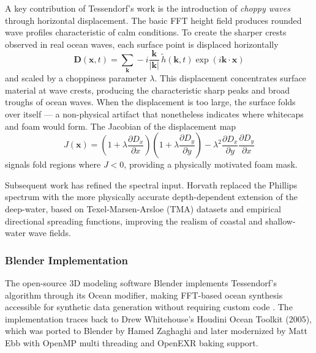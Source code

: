     A key contribution of Tessendorf's work is the introduction of \emph{choppy waves} through horizontal displacement. The basic FFT height field produces rounded wave profiles characteristic of calm conditions. To create the sharper crests observed in real ocean waves, each surface point is displaced horizontally
    \begin{equation}
        \mathbf{D}(\mathbf{x}, t) = \sum_{\mathbf{k}} -i\frac{\mathbf{k}}{|\mathbf{k}|}\, \tilde{h}(\mathbf{k}, t) \exp(i\mathbf{k} \cdot \mathbf{x})
        \label{eq:displacement}
    \end{equation}
    and scaled by a choppiness parameter $\lambda$. This displacement concentrates surface material at wave crests, producing the characteristic sharp peaks and broad troughs of ocean waves. When the displacement is too large, the surface folds over itself --- a non-physical artifact that nonetheless indicates where whitecaps and foam would form. The Jacobian of the displacement map
    \begin{equation}
        J(\mathbf{x}) = \left(1 + \lambda \frac{\partial D_x}{\partial x}\right)\left(1 + \lambda \frac{\partial D_y}{\partial y}\right) - \lambda^2 \frac{\partial D_x}{\partial y}\frac{\partial D_y}{\partial x}
        \label{eq:jacobian}
    \end{equation}
    signals fold regions where $J < 0$, providing a physically motivated foam mask.

    Subsequent work has refined the spectral input. Horvath \cite{Horvath2015} replaced the Phillips spectrum with the more physically accurate depth-dependent extension of the deep-water, based on Texel-Marsen-Arsloe (TMA) datasets and empirical directional spreading functions, improving the realism of coastal and shallow-water wave fields.

    \subsubsection{Blender Implementation}

    The open-source 3D modeling software Blender implements Tessendorf's algorithm through its Ocean modifier, making FFT-based ocean synthesis accessible for synthetic data generation without requiring custom code \cite{BlenderOceanModifier}. The implementation traces back to Drew Whitehouse's Houdini Ocean Toolkit (2005), which was ported to Blender by Hamed Zaghaghi and later modernized by Matt Ebb with OpenMP multi threading and OpenEXR baking support.

